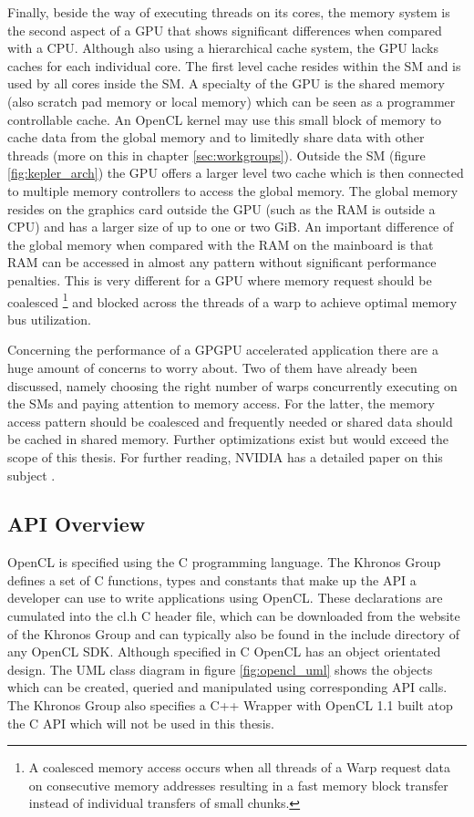 Finally, beside the way of executing threads on its cores, the memory system is the second aspect of a GPU that shows significant differences when compared with a CPU. Although also using a hierarchical cache system, the GPU lacks caches for each individual core. The first level cache resides within the SM and is used by all cores inside the SM. A specialty of the GPU is the shared memory (also scratch pad memory or local memory) which can be seen as a programmer controllable cache. An OpenCL kernel may use this small block of memory to cache data from the global memory and to limitedly share data with other threads (more on this in chapter \ref{sec:workgroups}). Outside the SM (figure \ref{fig:kepler_arch}) the GPU offers a larger level two cache which is then connected to multiple memory controllers to access the global memory. The global memory resides on the graphics card outside the GPU (such as the RAM is outside a CPU) and has a larger size of up to one or two GiB. An important difference of the global memory when compared with the RAM on the mainboard is that RAM can be accessed in almost any pattern without significant performance penalties. This is very different for a GPU where memory request should be coalesced \footnote{A coalesced memory access occurs when all threads of a Warp request data on consecutive memory addresses resulting in a fast memory block transfer instead of individual transfers of small chunks.} and blocked across the threads of a warp to achieve optimal memory bus utilization.

Concerning the performance of a GPGPU accelerated application there are a huge amount of concerns to worry about. Two of them have already been discussed, namely choosing the right number of warps concurrently executing on the SMs and paying attention to memory access. For the latter, the memory access pattern should be coalesced and frequently needed or shared data should be cached in shared memory. Further optimizations exist but would exceed the scope of this thesis. For further reading, NVIDIA has a detailed paper on this subject \cite{gpu_optimizations}.

\subsection{API Overview}

OpenCL is specified using the C programming language. The Khronos Group defines a set of C functions, types and constants that make up the API a developer can use to write applications using OpenCL. These declarations are cumulated into the cl.h C header file, which can be downloaded from the website of the Khronos Group and can typically also be found in the include directory of any OpenCL SDK. Although specified in C OpenCL has an object orientated design. The UML class diagram in figure \ref{fig:opencl_uml} shows the objects which can be created, queried and manipulated using corresponding API calls. The Khronos Group also specifies a C++ Wrapper with OpenCL 1.1 built atop the C API which will not be used in this thesis.

